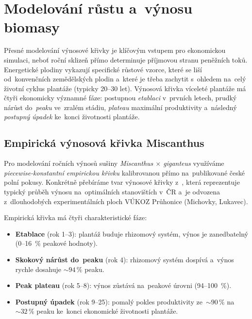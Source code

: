 \section{Modelování růstu a~výnosu biomasy}
\label{sec:modelovani-rustu}

Přesné modelování výnosové křivky je klíčovým vstupem pro ekonomickou
simulaci, neboť roční sklizeň přímo determinuje příjmovou stranu
peněžních toků. Energetické plodiny vykazují specifické růstové vzorce,
které se liší od~konvenčních zemědělských plodin a~které je třeba
zachytit s~ohledem na~celý životní cyklus plantáže (typicky 20--30 let).
Výnosová křivka víceleté plantáže má čtyři ekonomicky významné fáze:
postupnou \emph{etablaci} v~prvních letech, prudký nárůst do~\emph{peaku}
ve~zralém stádiu, \emph{plateau} maximální produktivity a~následný
\emph{postupný úpadek} ke~konci životnosti plantáže.

\subsection{Empirická výnosová křivka Miscanthus}
\label{subsec:miscanthus-yield-curve}

Pro modelování ročních výnosů sušiny \textit{Miscanthus $\times$ giganteus}
využíváme \emph{piecewise-konstantní empirickou křivku} kalibrovanou přímo
na~publikované české polní pokusy. Konkrétně přebíráme tvar výnosové
křivky  z~\citet{Weger2021}, která reprezentuje typický průběh výnosu
na~optimálních stanovištích v~ČR a~je odvozena z~dlouhodobých
experimentálních ploch VÚKOZ Průhonice (Michovky, Lukavec).

Empirická křivka má čtyři charakteristické fáze:
\begin{itemize}
    \item \textbf{Etablace} (rok 1--3): plantáž buduje rhizomový systém,
          výnos je zanedbatelný (0--16~\% peakové hodnoty).
    \item \textbf{Skokový nárůst do~peaku} (rok 4): rhizomový systém
          dospívá a~výnos rychle dosahuje $\sim 94\,\%$ peaku.
    \item \textbf{Peak plateau} (rok 5--8): výnos zůstává na~peakové
          úrovni (94--100~\%).
    \item \textbf{Postupný úpadek} (rok 9--25): pomalý pokles
          produktivity ze~$\sim 90\,\%$ na~$\sim 32\,\%$ peaku
          ke~konci ekonomické životnosti plantáže.
\end{itemize}

